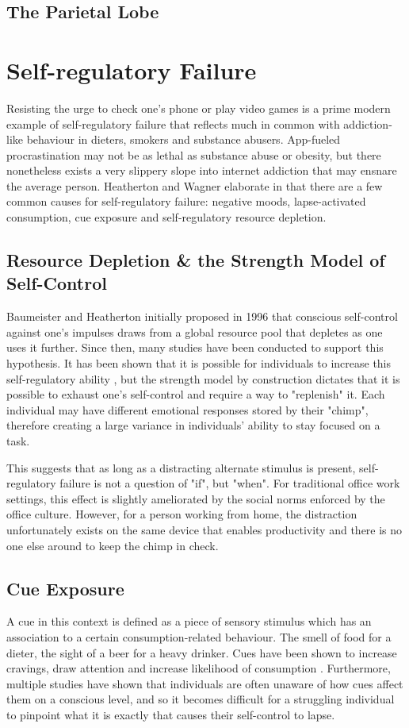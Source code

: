 \subsection{The Parietal Lobe}

\section{Self-regulatory Failure}
Resisting the urge to check one's phone or play video games is a prime modern example of self-regulatory failure that reflects much in common with addiction-like behaviour in dieters, smokers and substance abusers. App-fueled procrastination may not be as lethal as substance abuse or obesity, but there nonetheless exists a very slippery slope into internet addiction that may ensnare the average person. Heatherton and Wagner elaborate in \cite{heatherton2011cognitive} that there are a few common causes for self-regulatory failure: negative moods, lapse-activated consumption, cue exposure and self-regulatory resource depletion.

\subsection{Resource Depletion \& the Strength Model of Self-Control}
Baumeister and Heatherton \cite{baumeister1996self} initially proposed in 1996 that conscious self-control against one's impulses draws from a global resource pool that depletes as one uses it further. Since then, many studies have been conducted to support this hypothesis. It has been shown that it is possible for individuals to increase this self-regulatory ability \cite{TODO}, but the strength model by construction dictates that it is possible to exhaust one's self-control and require a way to "replenish" it. Each individual may have different emotional responses stored by their "chimp", therefore creating a large variance in individuals' ability to stay focused on a task.

This suggests that as long as a distracting alternate stimulus is present, self-regulatory failure is not a question of "if", but "when". For traditional office work settings, this effect is slightly ameliorated by the social norms enforced by the office culture. However, for a person working from home, the distraction unfortunately exists on the same device that enables productivity and there is no one else around to keep the chimp in check.


\subsection{Cue Exposure}
A cue in this context is defined as a piece of sensory stimulus which has an association to a certain consumption-related behaviour. The smell of food for a dieter, the sight of a beer for a heavy drinker. Cues have been shown to increase cravings, draw attention and increase likelihood of consumption \cite{jansen1998learning}. Furthermore, multiple studies have shown that individuals are often unaware of how cues affect them on a conscious level\cite{stacy2010implicit}, and so it becomes difficult for a struggling individual to pinpoint what it is exactly that causes their self-control to lapse.

